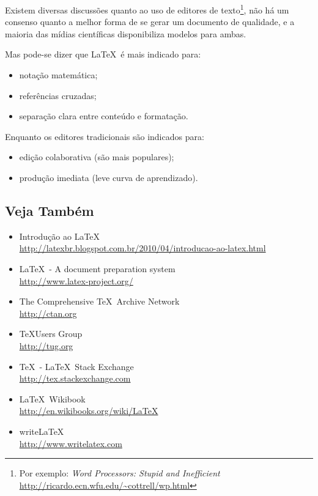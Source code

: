 %

Existem diversas discussões quanto ao uso de editores de texto\footnote{Por exemplo: 
\emph{Word Processors: Stupid and Inefficient} \url{http://ricardo.ecn.wfu.edu/~cottrell/wp.html}},
não há um consenso quanto a melhor forma de se gerar um documento de qualidade, 
e a maioria das mídias científicas disponibiliza modelos para ambas.

Mas pode-se dizer que \LaTeX\ é mais indicado para:
\begin{itemize}
	\item notação matemática;
	\item referências cruzadas;
	\item separação clara entre conteúdo e formatação.
\end{itemize}

Enquanto os editores tradicionais são indicados para:
\begin{itemize}
	\item edição colaborativa (são mais populares);
	\item produção imediata (leve curva de aprendizado).
\end{itemize}

\subsection{Veja Também}
\begin{itemize}
	\item Introdução ao \LaTeX
		\\\url{http://latexbr.blogspot.com.br/2010/04/introducao-ao-latex.html}
	\item \LaTeX\ - A document preparation system
		\\\url{http://www.latex-project.org/}
	\item The Comprehensive \TeX\ Archive Network
		\\\url{http://ctan.org}
	\item \TeX Users Group
		\\\url{http://tug.org}
	\item \TeX\ - \LaTeX\ Stack Exchange
		\\\url{http://tex.stackexchange.com}
	\item \LaTeX\ Wikibook
		\\\url{http://en.wikibooks.org/wiki/LaTeX}
	\item write\LaTeX
		\\\url{http://www.writelatex.com}
\end{itemize}


